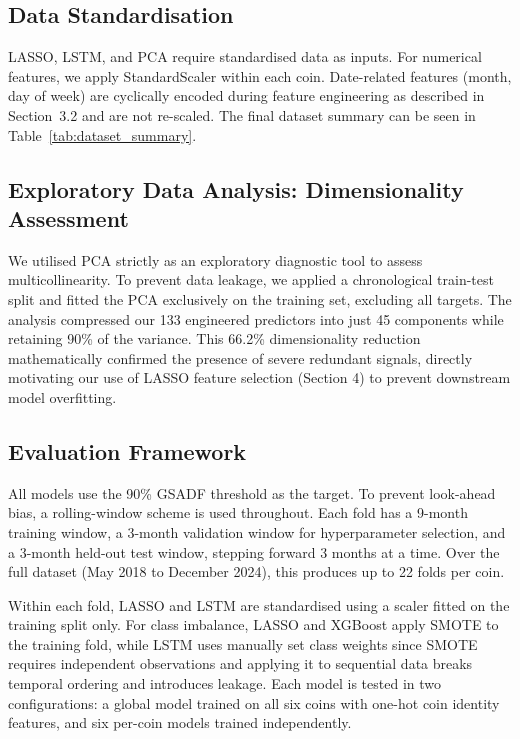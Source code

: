 \documentclass[12pt,a4paper]{article}
\begin{document}
\subsection{Data Standardisation}
LASSO, LSTM, and PCA require standardised data as inputs. For numerical features, we apply StandardScaler within each coin. Date-related features (month, day of week) are cyclically encoded during feature engineering as described in Section~3.2 and are not re-scaled. The final dataset summary can be seen in Table~\ref{tab:dataset_summary}. 

\subsection{Exploratory Data Analysis: Dimensionality Assessment}
We utilised PCA strictly as an exploratory diagnostic tool to assess multicollinearity. To prevent data leakage, we applied a chronological train-test split and fitted the PCA exclusively on the training set, excluding all targets. The analysis compressed our 133 engineered predictors into just 45 components while retaining 90\% of the variance. This 66.2\% dimensionality reduction mathematically confirmed the presence of severe redundant signals, directly motivating our use of LASSO feature selection (Section 4) to prevent downstream model overfitting.
 


\subsection{Evaluation Framework}
All models use the 90\% GSADF threshold as the target. To prevent look-ahead 
bias, a rolling-window scheme is used throughout. Each fold has a 9-month 
training window, a 3-month validation window for hyperparameter selection, 
and a 3-month held-out test window, stepping forward 3 months at a time. 
Over the full dataset (May 2018 to December 2024), this produces up to 22 
folds per coin.

Within each fold, LASSO and LSTM are standardised using a scaler fitted on 
the training split only. For class imbalance, LASSO and XGBoost apply SMOTE 
to the training fold, while LSTM uses manually set class weights since SMOTE 
requires independent observations and applying it to sequential data breaks 
temporal ordering and introduces leakage. Each model is tested in two 
configurations: a global model trained on all six coins with one-hot coin 
identity features, and six per-coin models trained independently.
\end{document}
